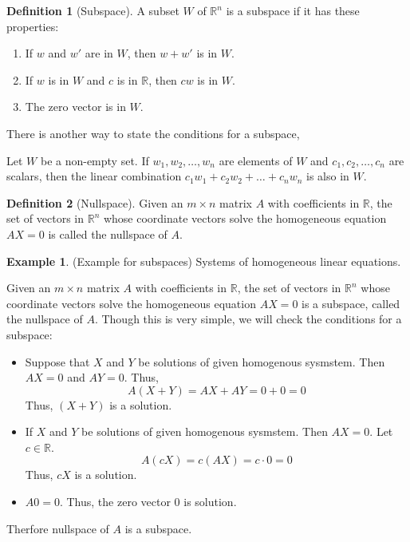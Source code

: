 \documentclass[
]{book}
\providecommand{\tightlist}{%
  \setlength{\itemsep}{0pt}\setlength{\parskip}{0pt}}
\theoremstyle{definition}
\newtheorem{definition}{Definition}[chapter]
\theoremstyle{definition}
\newtheorem{example}{Example}[chapter]
\theoremstyle{definition}
\theoremstyle{definition}
\theoremstyle{remark}
\begin{document}
\begin{definition}[Subspace]
\protect\hypertarget{def:unnamed-chunk-70}{}\label{def:unnamed-chunk-70}A subset \(W\) of \(\mathbb{R}^n\) is a subspace if it has these properties:

\begin{enumerate}
\def\labelenumi{\alph{enumi}.}
\tightlist
\item
  If \(w\) and \(w'\) are in \(W\), then \(w + w'\) is in \(W\).
\item
  If \(w\) is in \(W\) and \(c\) is in \(\mathbb{R}\), then \(cw\) is in \(W\).
\item
  The zero vector is in \(W\).
\end{enumerate}

There is another way to state the conditions for a subspace,

Let \(W\) be a non-empty set. If \(w_1, w_2, \ldots, w_n\) are elements of \(W\) and \(c_1, c_2, \ldots, c_n\) are scalars, then the linear combination \(c_1w_1 + c_2w_2 + \ldots + c_nw_n\) is also in \(W\).
\end{definition}

\begin{definition}[Nullspace]
\protect\hypertarget{def:unnamed-chunk-71}{}\label{def:unnamed-chunk-71}Given an \(m \times n\) matrix \(A\) with coefficients in \(\mathbb{R}\), the set of vectors in \(\mathbb{R}^n\) whose coordinate vectors solve the homogeneous equation \(AX = 0\) is called the nullspace of \(A\).
\end{definition}

\begin{example}
\protect\hypertarget{exm:unnamed-chunk-72}{}\label{exm:unnamed-chunk-72}(Example for subspaces) Systems of homogeneous linear equations.

Given an \(m \times n\) matrix \(A\) with coefficients in \(\mathbb{R}\), the set of vectors in \(\mathbb{R}^n\) whose coordinate vectors solve the homogeneous equation \(AX = 0\) is a subspace, called the nullspace of \(A\). Though this is very simple, we will check the conditions for a subspace:

\begin{itemize}
\tightlist
\item
  Suppose that \(X\) and \(Y\) be solutions of given homogenous sysmstem. Then \(AX=0\) and \(AY=0\). Thus,
  \[A(X+Y)=AX+AY=0+0=0\]
  Thus, \((X+Y)\) is a solution.
\item
  If \(X\) and \(Y\) be solutions of given homogenous sysmstem. Then \(AX=0\). Let \(c\in \mathbb{R}\).
  \[A(cX)=c(AX)=c\cdot 0=0\]
  Thus, \(cX\) is a solution.
\item
  \(A0=0\). Thus, the zero vector \(0\) is solution.
\end{itemize}

Therfore nullspace of \(A\) is a subspace.
\end{example}
\end{document}
